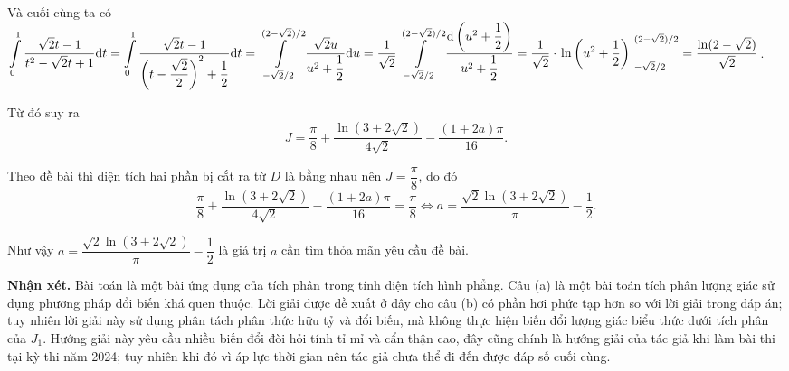 \begin{enumerate}
{    Và cuối cùng ta có $\displaystyle\int\displaylimits_{0}^{1}\dfrac{\sqrt{2}t - 1}{t^2 - \sqrt{2}t + 1}\mathrm{d}t = \displaystyle\int\displaylimits_{0}^{1}\dfrac{\sqrt{2}t - 1}{\left(t - \dfrac{\sqrt{2}}{2}\right)^2 + \dfrac{1}{2}}\mathrm{d}t = \displaystyle\int\displaylimits_{-\sqrt{2}/2}^{(2-\sqrt{2})/2}\dfrac{\sqrt{2}u}{u^2 + \dfrac{1}{2}}\mathrm{d}u = \dfrac{1}{\sqrt{2}}\displaystyle\int\displaylimits_{-\sqrt{2}/2}^{(2-\sqrt{2})/2}\dfrac{\mathrm{d}\left(u^2 + \dfrac{1}{2}\right)}{u^2 + \dfrac{1}{2}} = \dfrac{1}{\sqrt{2}}\cdot \left.\ln \left(u^2 + \dfrac{1}{2}\right)\right|_{-\sqrt{2}/2}^{(2-\sqrt{2})/2} = \dfrac{\ln (2 - \sqrt{2})}{\sqrt{2}}$.

    Từ đó suy ra $$J = \dfrac{\pi}{8} + \dfrac{\ln(3 + 2\sqrt{2})}{4\sqrt{2}} - \dfrac{(1+2a)\pi}{16}.$$

    Theo đề bài thì diện tích hai phần bị cắt ra từ $D$ là bằng nhau nên $J = \dfrac{\pi}{8}$, do đó $$\dfrac{\pi}{8} + \dfrac{\ln(3 + 2\sqrt{2})}{4\sqrt{2}} - \dfrac{(1+2a)\pi}{16} = \dfrac{\pi}{8} \iff a = \dfrac{\sqrt{2}\ln(3+2\sqrt{2})}{\pi} - \dfrac{1}{2}.$$

    Như vậy $a = \dfrac{\sqrt{2}\ln(3+2\sqrt{2})}{\pi} - \dfrac{1}{2}$ là giá trị $a$ cần tìm thỏa mãn yêu cầu đề bài.}
\end{enumerate}

\textbf{Nhận xét. }Bài toán là một bài ứng dụng của tích phân trong tính diện tích hình phẳng. Câu (a) là một bài toán tích phân lượng giác sử dụng phương pháp đổi biến khá quen thuộc. Lời giải được đề xuất ở đây cho câu (b) có phần hơi phức tạp hơn so với lời giải trong đáp án; tuy nhiên lời giải này sử dụng phân tách phân thức hữu tỷ và đổi biến, mà không thực hiện biến đổi lượng giác biểu thức dưới tích phân của $J_1$. Hướng giải này yêu cầu nhiều biến đổi đòi hỏi tính tỉ mỉ và cẩn thận cao, đây cũng chính là hướng giải của tác giả khi làm bài thi tại kỳ thi năm 2024; tuy nhiên khi đó vì áp lực thời gian nên tác giả chưa thể đi đến được đáp số cuối cùng.